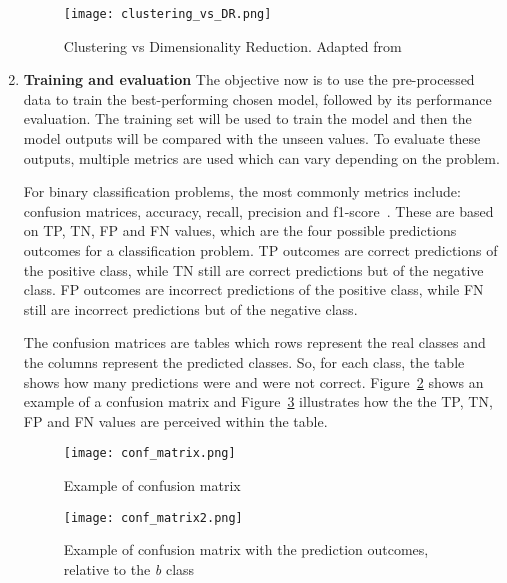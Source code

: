 \begin{enumerate}
    \begin{figure}[htbp]
        \centering
        \texttt{[image: clustering\_vs\_DR.png]}
        \caption{Clustering vs Dimensionality Reduction. Adapted from~\cite{Beck2020AModelling}}
        \label{fig:clustering_vs_DR}
    \end{figure}
    
    \item \textbf{Training and evaluation} The objective now is to use the pre-processed data to train the best-performing chosen model, followed by its performance evaluation. 
    The training set will be used to train the model and then the model outputs will be compared with the unseen values. To evaluate these outputs, multiple metrics are used which can vary depending on the problem. 
    
    For binary classification problems, the most commonly metrics include: confusion matrices, accuracy, recall, precision and f1-score~\cite{Liu2014AEvaluation}. These are based on \gls{TP}, \gls{TN}, \gls{FP} and \gls{FN} values, which are the four possible predictions outcomes for a classification problem. \gls{TP} outcomes are correct predictions of the positive class, while \gls{TN} still are correct predictions but of the negative class. \gls{FP} outcomes are incorrect predictions of the positive class, while \gls{FN} still are incorrect predictions but of the negative class. 
    
    The confusion matrices are tables which rows represent the real classes and the columns represent the predicted classes. So, for each class, the table shows how many predictions were and were not correct. Figure~\ref{fig:conf_matrix} shows an example of a confusion matrix and Figure~\ref{fig:conf_matrix2} illustrates how the the \gls{TP}, \gls{TN}, \gls{FP} and \gls{FN} values are perceived within the table.
    
    \begin{figure}[htbp]
        \centering
        \texttt{[image: conf\_matrix.png]}
        \caption{Example of confusion matrix}
        \label{fig:conf_matrix}
    \end{figure}
    
    \begin{figure}[htbp]
        \centering
        \texttt{[image: conf\_matrix2.png]}
        \caption{Example of confusion matrix with the prediction outcomes, relative to the \textit{b} class}
        \label{fig:conf_matrix2}
    \end{figure}
    

\end{enumerate}
